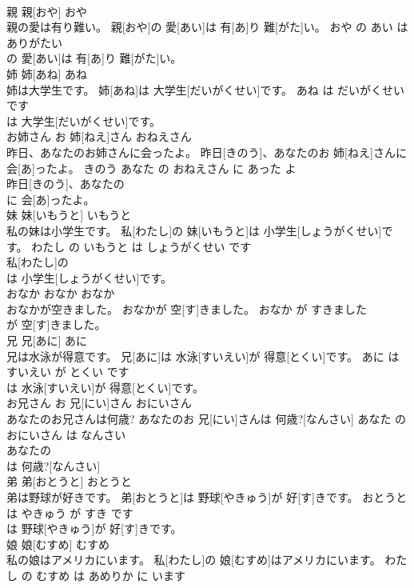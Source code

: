 \documentclass[8pt]{extreport}
\begin{document}
\begin{CJK}{UTF8}{min}
\\	親	親[おや]	おや	
\\	親の愛は有り難い。	親[おや]の 愛[あい]は 有[あ]り 難[がた]い。	おや の あい は ありがたい	
\\	の 愛[あい]は 有[あ]り 難[がた]い。			
\\	姉	姉[あね]	あね	
\\	姉は大学生です。	姉[あね]は 大学生[だいがくせい]です。	あね は だいがくせい です	
\\	は 大学生[だいがくせい]です。			
\\	お姉さん	お 姉[ねえ]さん	おねえさん	
\\	昨日、あなたのお姉さんに会ったよ。	昨日[きのう]、あなたのお 姉[ねえ]さんに 会[あ]ったよ。	きのう あなた の おねえさん に あった よ	
\\	昨日[きのう]、あなたの
\\	に 会[あ]ったよ。			
\\	妹	妹[いもうと]	いもうと	
\\	私の妹は小学生です。	私[わたし]の 妹[いもうと]は 小学生[しょうがくせい]です。	わたし の いもうと は しょうがくせい です	
\\	私[わたし]の
\\	は 小学生[しょうがくせい]です。			
\\	おなか	おなか	おなか	
\\	おなかが空きました。	おなかが 空[す]きました。	おなか が すきました	
\\	が 空[す]きました。			
\\	兄	兄[あに]	あに	
\\	兄は水泳が得意です。	兄[あに]は 水泳[すいえい]が 得意[とくい]です。	あに は すいえい が とくい です	
\\	は 水泳[すいえい]が 得意[とくい]です。			
\\	お兄さん	お 兄[にい]さん	おにいさん	
\\	あなたのお兄さんは何歳?	あなたのお 兄[にい]さんは 何歳?[なんさい]	あなた の おにいさん は なんさい	
\\	あなたの
\\	は 何歳?[なんさい]			
\\	弟	弟[おとうと]	おとうと	
\\	弟は野球が好きです。	弟[おとうと]は 野球[やきゅう]が 好[す]きです。	おとうと は やきゅう が すき です	
\\	は 野球[やきゅう]が 好[す]きです。			
\\	娘	娘[むすめ]	むすめ	
\\	私の娘はアメリカにいます。	私[わたし]の 娘[むすめ]はアメリカにいます。	わたし の むすめ は あめりか に います	

\end{CJK}
\end{document}
